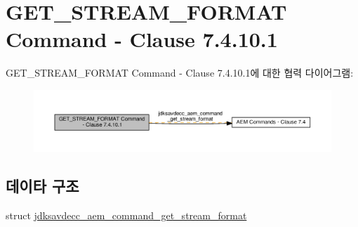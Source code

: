 \hypertarget{group__command__get__stream__format}{}\section{G\+E\+T\+\_\+\+S\+T\+R\+E\+A\+M\+\_\+\+F\+O\+R\+M\+AT Command -\/ Clause 7.4.10.1}
\label{group__command__get__stream__format}
G\+E\+T\+\_\+\+S\+T\+R\+E\+A\+M\+\_\+\+F\+O\+R\+M\+AT Command -\/ Clause 7.4.10.1에 대한 협력 다이어그램\+:
\nopagebreak
\begin{figure}[H]
\begin{center}
\leavevmode
\includegraphics[width=350pt]{group__command__get__stream__format}
\end{center}
\end{figure}
\subsection*{데이타 구조}
\begin{DoxyCompactItemize}
\item 
struct \hyperlink{structjdksavdecc__aem__command__get__stream__format}{jdksavdecc\+\_\+aem\+\_\+command\+\_\+get\+\_\+stream\+\_\+format}
\end{DoxyCompactItemize}
